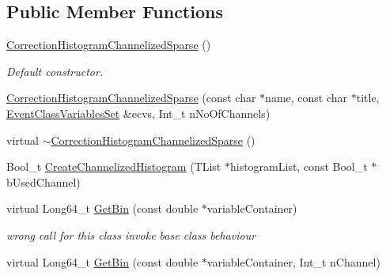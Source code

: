 \subsection*{Public Member Functions}
\begin{DoxyCompactItemize}
\item 
\mbox{\label{classQn_1_1CorrectionHistogramChannelizedSparse_a623217a23dea7235cb4e03ad3f401f29}} 
\mbox{\hyperlink{classQn_1_1CorrectionHistogramChannelizedSparse_a623217a23dea7235cb4e03ad3f401f29}{Correction\+Histogram\+Channelized\+Sparse}} ()
\begin{DoxyCompactList}\small\item\em Default constructor. \end{DoxyCompactList}\item 
\mbox{\hyperlink{classQn_1_1CorrectionHistogramChannelizedSparse_a018a19416ce8241d58db9d611cfcc1ac}{Correction\+Histogram\+Channelized\+Sparse}} (const char $\ast$name, const char $\ast$title, \mbox{\hyperlink{classQn_1_1EventClassVariablesSet}{Event\+Class\+Variables\+Set}} \&ecvs, Int\+\_\+t n\+No\+Of\+Channels)
\item 
virtual \mbox{\hyperlink{classQn_1_1CorrectionHistogramChannelizedSparse_a7d0b5bd1526fa4c8464aed5aa15ca208}{$\sim$\+Correction\+Histogram\+Channelized\+Sparse}} ()
\item 
Bool\+\_\+t \mbox{\hyperlink{classQn_1_1CorrectionHistogramChannelizedSparse_af17e3d8de269e5e3f620ccc5896b06b3}{Create\+Channelized\+Histogram}} (T\+List $\ast$histogram\+List, const Bool\+\_\+t $\ast$b\+Used\+Channel)
\item 
\mbox{\label{classQn_1_1CorrectionHistogramChannelizedSparse_aadda1224f18ee306c731f78855c3b3b0}} 
virtual Long64\+\_\+t \mbox{\hyperlink{classQn_1_1CorrectionHistogramChannelizedSparse_aadda1224f18ee306c731f78855c3b3b0}{Get\+Bin}} (const double $\ast$variable\+Container)
\begin{DoxyCompactList}\small\item\em wrong call for this class invoke base class behaviour \end{DoxyCompactList}\item 
virtual Long64\+\_\+t \mbox{\hyperlink{classQn_1_1CorrectionHistogramChannelizedSparse_a02df93ea7f488eab8cd0c781c1c71808}{Get\+Bin}} (const double $\ast$variable\+Container, Int\+\_\+t n\+Channel)
\item 

\end{DoxyCompactItemize}
